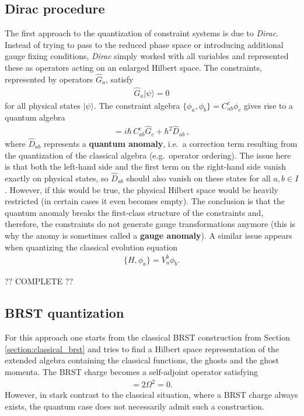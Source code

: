 \subsection{Dirac procedure}

    The first approach to the quantization of constraint systems is due to \textit{Dirac}. Instead of trying to pass to the reduced phase space or introducing additional gauge fixing conditions, \textit{Dirac} simply worked with all variables and represented these as operators acting on an enlarged Hilbert space. The constraints, represented by operators $\hat{G}_a$, satisfy
    \begin{gather}
        \hat{G}_a|\psi\rangle=0
    \end{gather}
    for all physical states $|\psi\rangle$. The constraint algebra $\{\phi_a,\phi_b\} = C^c_{ab}\phi_c$ gives rise to a quantum algebra
    \begin{gather}
        [\hat{G}_a,\hat{G}_b] = i\hbar\,C^c_{ab}\hat{G}_c + \hbar^2\hat{D}_{ab}\,,
    \end{gather}
    where $\hat{D}_{ab}$ represents a \textbf{quantum anomaly}, i.e.~a correction term resulting from the quantization of the classical algebra (e.g.~operator ordering). The issue here is that both the left-hand side and the first term on the right-hand side vanish exactly on physical states, so $\hat{D}_{ab}$ should also vanish on these states for all $a,b\in I$. However, if this would be true, the physical Hilbert space would be heavily restricted (in certain cases it even becomes empty). The conclusion is that the quantum anomaly breaks the first-class structure of the constraints and, therefore, the constraints do not generate gauge transformations anymore (this is why the anomy is sometimes called a \textbf{gauge anomaly}). A similar issue appears when quantizing the classical evolution equation
    \begin{gather}
        \{H,\phi_a\} = V_a^b\phi_b.
    \end{gather}

    ?? COMPLETE ??

\subsection{BRST quantization}

    For this approach one starts from the classical BRST construction from Section \ref{section:classical_brst} and tries to find a Hilbert space representation of the extended algebra containing the classical functions, the ghosts and the ghost momenta. The BRST charge becomes a self-adjoint operator satisfying
    \begin{gather}
        [\Omega,\Omega] = 2\Omega^2 = 0.
    \end{gather}
    However, in stark contrast to the classical situation, where a BRST charge always exists, the quantum case does not necessarily admit such a construction.

